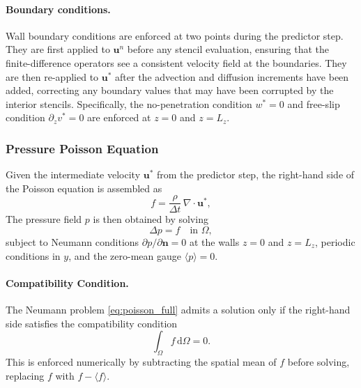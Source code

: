 \paragraph{Boundary conditions.}
Wall boundary conditions are enforced at two points during the
predictor step. They are first applied to $\mathbf{u}^n$ before any
stencil evaluation, ensuring that the finite-difference operators
see a consistent velocity field at the boundaries. They are then
re-applied to $\mathbf{u}^*$ after the advection and diffusion
increments have been added, correcting any boundary values that
may have been corrupted by the interior stencils. Specifically,
the no-penetration condition $w^* = 0$ and free-slip condition
$\partial_z v^* = 0$ are enforced at $z = 0$ and $z = L_z$.

\subsubsection{Pressure Poisson Equation}
Given the intermediate velocity $\mathbf{u}^*$ from the predictor step,
the right-hand side of the Poisson equation is assembled as
\begin{equation}
    f = \frac{\rho}{\Delta t}\,\nabla \cdot \mathbf{u}^*,
    \label{eq:poisson_rhs}
\end{equation}
The pressure field $p$ is then obtained by solving
\begin{equation}
    \Delta p = f \quad \text{in } \Omega,
    \label{eq:poisson_full}
\end{equation}
subject to Neumann conditions $\partial p / \partial \mathbf{n} = 0$
at the walls $z = 0$ and $z = L_z$, periodic conditions in $y$, and the
zero-mean gauge $\langle p \rangle = 0$.

\paragraph{Compatibility Condition.}
The Neumann problem \eqref{eq:poisson_full} admits a solution only if
the right-hand side satisfies the compatibility condition
\begin{equation}
    \int_\Omega f \, \mathrm{d}\Omega = 0.
    \label{eq:compatibility}
\end{equation}
This is enforced numerically by subtracting the spatial mean of $f$
before solving, replacing $f$ with $f - \langle f \rangle$.

